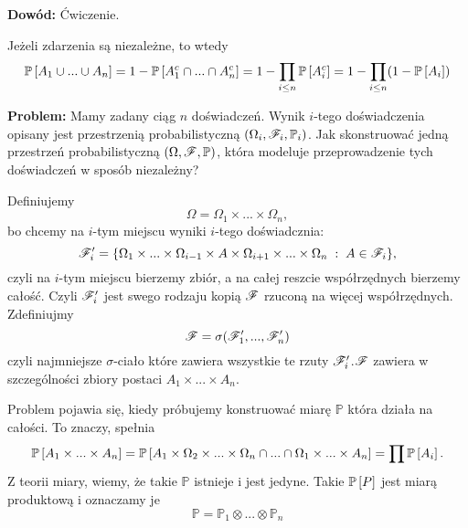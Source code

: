\textbf{Dowód:} {\large\color{orange}Ćwiczenie}.

 Jeżeli zdarzenia są niezależne, to wtedy 
$$\mathbb{P}\left[A_1\cup...\cup A_n\right]=1-\mathbb{P}\left[A_1^c\cap...\cap A_n^c\right]=1-\prod\limits_{i\leq n}\mathbb{P}\left[A_i^c\right]=1-\prod\limits_{i\leq n}(1-\mathbb{P}\left[A_i\right])$$

\textbf{Problem:} Mamy zadany ciąg $n$ doświadczeń. Wynik $i$-tego doświadczenia opisany jest przestrzenią probabilistyczną $(\Omega_i,\mathcal{F}_i,\mathbb{P}_i)$. Jak skonstruować jedną przestrzeń probabilistyczną $(\Omega, \mathcal{F}, \mathbb{P})$, która modeluje przeprowadzenie tych doświadczeń w sposób niezależny?

Definiujemy
$$\Omega=\Omega_1\times...\times\Omega_n,$$
bo chcemy na $i$-tym miejscu wyniki $i$-tego doświadcznia:
$$\mathcal{F}_i'=\{\Omega_1\times...\times\Omega_{i-1}\times A\times\Omega_{i+1}\times...\times\Omega_n\;:\;A\in\mathcal{F}_i\},$$
czyli na $i$-tym miejscu bierzemy zbiór, a na całej reszcie współrzędnych bierzemy całość. Czyli $\mathcal{F}_i'$ jest swego rodzaju kopią $\mathcal{F}$ rzuconą na więcej współrzędnych. Zdefiniujmy
$$\mathcal{F}=\sigma(\mathcal{F}_1',...,\mathcal{F}_n')$$
czyli najmniejsze $\sigma$-ciało które zawiera wszystkie te rzuty $\mathcal{F}_i'$.$\mathcal{F}$ zawiera w szczególności zbiory postaci $A_1\times...\times A_n$.

Problem pojawia się, kiedy próbujemy konstruować miarę $\mathbb{P}$ która działa na całości. To znaczy, spełnia
$$\mathbb{P}\left[A_1\times...\times A_n\right]=\mathbb{P}\left[A_1\times\Omega_2\times...\times\Omega_n\cap...\cap\Omega_1\times...\times A_n\right]=\prod\mathbb{P}\left[A_i\right].$$
Z teorii miary, wiemy, że takie $\mathbb{P}$ istnieje i jest jedyne. Takie $\mathbb{P}\left[P\right]$ jest miarą produktową i oznaczamy je
$$\mathbb{P}=\mathbb{P}_1\otimes...\otimes\mathbb{P}_n$$